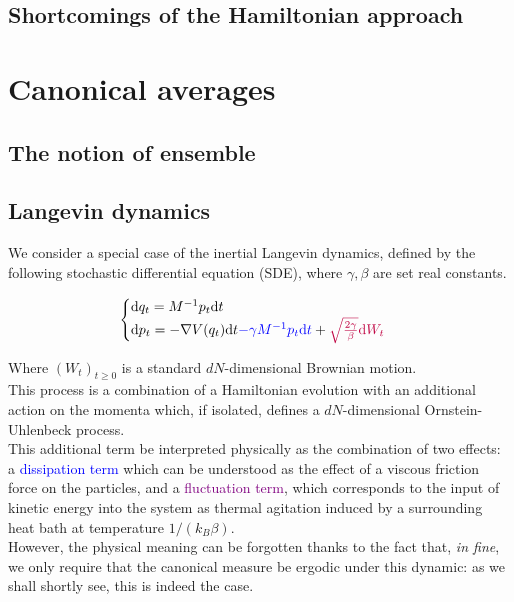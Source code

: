     \subsection{Shortcomings of the Hamiltonian approach}

\section{Canonical averages}
    \subsection{The notion of ensemble}

\subsection{Langevin dynamics}
We consider a special case of the inertial Langevin dynamics, defined by the following stochastic differential equation (SDE), where $\gamma, \beta$ are set real constants.

\begin{equation}
    \label{Langevin}
    \begin{cases}
        \text dq_t=M^{-1}p_t\text dt \\
        \text dp_t= -\nabla V(q_t)\text dt \textcolor{blue}{-\gamma M^{-1}p_t\text dt}+\textcolor{purple}{\sqrt{\frac{2\gamma}\beta}\text dW_t}
    \end{cases}
\end{equation}

Where $(W_t)_{t\geq 0}$ is a standard $dN$-dimensional Brownian motion.\\
This process is a combination of a Hamiltonian evolution with an additional action on the momenta which, if isolated, defines a $dN$-dimensional Ornstein-Uhlenbeck process.\\
This additional term be interpreted physically as the combination of two effects: a \textcolor{blue}{dissipation term} which can be understood as the effect of a viscous friction force on the particles, and a \textcolor{purple}{fluctuation term}, which corresponds to the input of kinetic energy into the system as thermal agitation induced by a surrounding heat bath at temperature $1/(k_B\beta)$.\\
However, the physical meaning can be forgotten thanks to the fact that, \textit{in fine}, we only require that the canonical measure be ergodic under this dynamic: as we shall shortly see, this is indeed the case.

